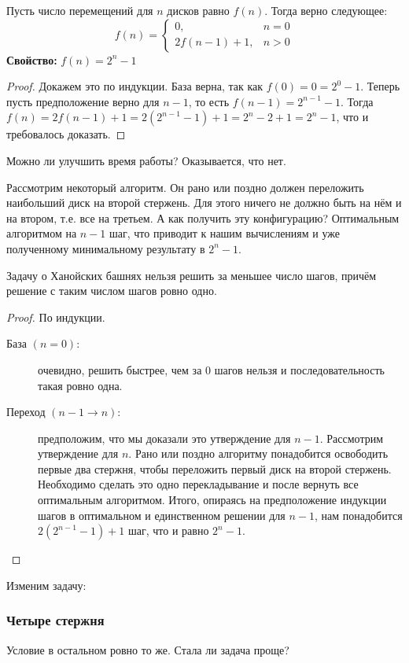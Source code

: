 Пусть число перемещений для $n$ дисков равно $f(n)$. Тогда верно следующее: \[f(n) = \begin{cases}0, &n=0\\2f(n-1)+1, &n>0\end{cases}\]
\textbf{Свойство:} \textit{$f(n) = 2^n - 1$}
\begin{proof} Докажем это по индукции. База верна, так как $f(0) = 0 = 2^0 - 1$. Теперь пусть предположение верно для $n - 1$, то есть $f(n - 1) = 2^{n - 1} - 1$. Тогда $f(n) = 2f(n - 1) + 1 = 2(2^{n - 1} - 1) + 1 = 2^n - 2 + 1 = 2^n - 1$, что и требовалось доказать. \end{proof}

Можно ли улучшить время работы? Оказывается, что нет.

Рассмотрим некоторый алгоритм. Он рано или поздно должен переложить наибольший диск на второй стержень. Для этого ничего не должно быть на нём и на втором, т.е. все на третьем. А как получить эту конфигурацию? Оптимальным алгоритмом на $n-1$ шаг, что приводит к нашим вычислениям и уже полученному минимальному результату в $2^n-1$.

\begin{minimal_steps}
Задачу о Ханойских башнях нельзя решить за меньшее число шагов, причём решение с таким числом шагов ровно одно.
\end{minimal_steps}
\begin{proof}
По индукции.
\begin{description}
\item[База $(n = 0)$:] очевидно, решить быстрее, чем за 0 шагов нельзя и последовательность такая ровно одна.

\item[Переход $(n - 1 \to n)$:] предположим, что мы доказали это утверждение для $n-1$. Рассмотрим утверждение для $n$. Рано или поздно алгоритму понадобится освободить первые два стержня, чтобы переложить первый диск на второй стержень. Необходимо сделать это одно перекладывание и после вернуть все оптимальным алгоритмом. Итого, опираясь на предположение индукции шагов в оптимальном и единственном решении для $n-1$, нам понадобится $2(2^{n-1} - 1) + 1$ шаг, что и равно $2^n -1$. \qedhere
\end{description}
\end{proof}

Изменим задачу:
\subsubsection*{Четыре стержня}
Условие в остальном ровно то же. 
Стала ли задача проще?


